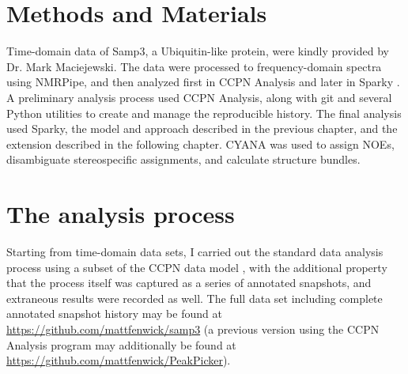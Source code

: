 \section{Methods and Materials}

Time-domain data of Samp3, a Ubiquitin-like protein, were kindly provided by 
Dr. Mark Maciejewski.  The data were processed to frequency-domain spectra
using NMRPipe, and then analyzed first in CCPN Analysis \cite{ccpn} and later 
in Sparky \cite{sparky}.  A preliminary analysis process used CCPN Analysis,
along with git and several Python utilities to create and manage the 
reproducible history.  The final analysis used Sparky, the model and approach
described in the previous chapter, and the extension described in the following
chapter.  CYANA was used to assign NOEs,
disambiguate stereospecific assignments, and calculate structure bundles.


\section{The analysis process}
Starting from time-domain data sets, I carried out the standard data analysis
process using a subset of the CCPN data model \cite{ccpn}, 
with the additional property that the process itself was captured as
a series of annotated snapshots, and extraneous results were recorded as well.
The full data set including complete annotated snapshot history may be found at 
\url{https://github.com/mattfenwick/samp3}
(a previous version using the CCPN Analysis program may additionally be found
at \url{https://github.com/mattfenwick/PeakPicker}).



